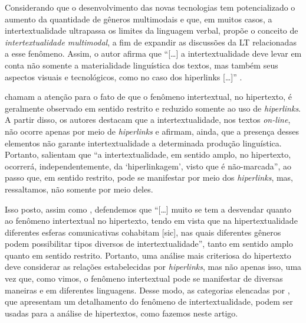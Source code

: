 \documentclass{textolivre}
\begin{document}
Considerando que o desenvolvimento das novas tecnologias tem potencializado o aumento da quantidade de gêneros multimodais e que, em muitos casos, a intertextualidade ultrapassa os limites da linguagem verbal, \textcite{garcia_intertextualidade_2020} propõe o conceito de \textit{intertextualidade multimodal}, a fim de expandir as discussões da LT relacionadas a esse fenômeno. Assim, o autor afirma que “[…] a intertextualidade deve levar em conta não somente a materialidade linguística dos textos, mas também seus aspectos visuais e tecnológicos, como no caso dos hiperlinks […]” \cite[p. 125]{garcia_intertextualidade_2020}.

\textcite{araujo_consideracoes_2009} chamam a atenção para o fato de que o fenômeno intertextual, no hipertexto, é geralmente observado em sentido restrito e reduzido somente ao uso de \textit{hiperlinks}. A partir disso, os autores destacam que a intertextualidade, nos textos \textit{on-line}, não ocorre apenas por meio de \textit{hiperlinks} e afirmam, ainda, que a presença desses elementos não garante intertextualidade a determinada produção linguística. Portanto, \textcite[p. 578]{araujo_consideracoes_2009} salientam que “a intertextualidade, em sentido amplo, no hipertexto, ocorrerá, independentemente, da ‘hiperlinkagem’, visto que é não-marcada”, ao passo que, em sentido restrito, pode se manifestar por meio dos \textit{hiperlinks}, mas, ressaltamos, não somente por meio deles.

Isso posto, assim como \textcite[p. 580]{araujo_consideracoes_2009}, defendemos que “[…] muito se tem a desvendar quanto ao fenômeno intertextual no hipertexto, tendo em vista que na hipertextualidade diferentes esferas comunicativas cohabitam [sic], nas quais diferentes gêneros podem possibilitar tipos diversos de intertextualidade”, tanto em sentido amplo quanto em sentido restrito. Portanto, uma análise mais criteriosa do hipertexto deve considerar as relações estabelecidas por \textit{hiperlinks}, mas não apenas isso, uma vez que, como vimos, o fenômeno intertextual pode se manifestar de diversas maneiras e em diferentes linguagens. Desse modo, as categorias elencadas por \textcite{koch_intertextualidade:_2012}, que apresentam um detalhamento do fenômeno de intertextualidade, podem ser usadas para a análise de hipertextos, como fazemos neste artigo.
\end{document}
